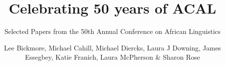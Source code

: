 \title{Celebrating 50 years of ACAL}
\subtitle{Selected Papers from the 50th Annual Conference on African Linguistics}
\author{Lee Bickmore,   Michael Cahill,   Michael Diercks,   Laura J Downing,   James Essegbey,   Katie Franich,   Laura McPherson \&   Sharon Rose   }
\renewcommand{\lsImpressionCitationAuthor}{Bickmore, Lee,   Michael Cahill,   Michael Diercks,   Laura J Downing,   James Essegbey,   Katie Franich,\newlineCover   Laura McPherson \&   Sharon Rose}
\renewcommand{\lsSeries}{calseries}%
\renewcommand{\lsSeriesNumber}{}

